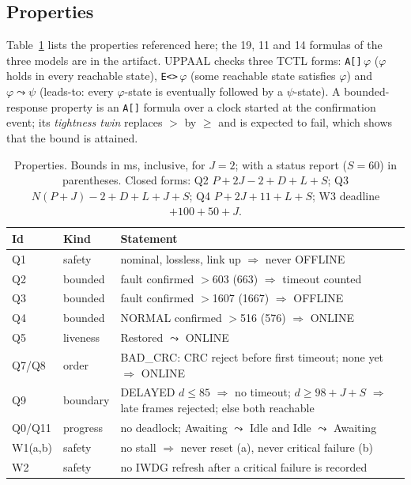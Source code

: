 \documentclass[conference,a4paper]{IEEEtran}
\newif\ifrerunmarks
\DeclareRobustCommand{\rerun}[1]{\ifrerunmarks\textcolor{red}{#1}\else#1\fi}
\begin{document}
\subsection{Properties}
\label{sec:props}
Table~\ref{tab:props} lists the properties referenced here; the 19, 11 and 14 formulas of the three models are in the artifact. UPPAAL checks three TCTL forms: \texttt{A[]}\,$\varphi$ ($\varphi$ holds in every reachable state), \texttt{E<>}\,$\varphi$ (some reachable state satisfies $\varphi$) and $\varphi \leadsto \psi$ (leads-to: every $\varphi$-state is eventually followed by a $\psi$-state). A bounded-response property is an \texttt{A[]} formula over a clock started at the confirmation event; its \emph{tightness twin} replaces $>$ by $\ge$ and is expected to fail, which shows that the bound is attained.

\begin{table}[t]
\centering\footnotesize
\caption{Properties. Bounds in ms, inclusive, for \rerun{$J{=}2$}; with a status report (\rerun{$S{=}60$}) in parentheses. Closed forms: Q2 $P{+}2J{-}2{+}D{+}L{+}S$; Q3 $N(P{+}J){-}2{+}D{+}L{+}J{+}S$; Q4 $P{+}2J{+}\rerun{11}{+}L{+}S$; W3 deadline${+}100{+}50{+}J$.}
\label{tab:props}
\setlength{\tabcolsep}{4pt}
\begin{tabularx}{\columnwidth}{@{}l l >{\raggedright\arraybackslash}X@{}}
\toprule
Id & Kind & Statement \\
\midrule
Q1 & safety & nominal, lossless, link up $\Rightarrow$ never OFFLINE \\
Q2 & bounded & fault confirmed $>$\rerun{603 (663)} $\Rightarrow$ timeout counted \\
Q3 & bounded & fault confirmed $>$\rerun{1607 (1667)} $\Rightarrow$ OFFLINE \\
Q4 & bounded & NORMAL confirmed $>$\rerun{516 (576)} $\Rightarrow$ ONLINE \\
Q5 & liveness & Restored $\leadsto$ ONLINE \\
Q7/Q8 & order & BAD\_CRC: CRC reject before first timeout; none yet $\Rightarrow$ ONLINE \\
Q9 & boundary & DELAYED $d{\le}\rerun{85}$ $\Rightarrow$ no timeout; $d{\ge}98{+}J{+}S$ $\Rightarrow$ late frames rejected; else both reachable \\
Q0/Q11 & progress & no deadlock; Awaiting $\leadsto$ Idle and Idle $\leadsto$ Awaiting \\
W1(a,b) & safety & no stall $\Rightarrow$ never reset (a), never critical failure (b) \\
W2 & safety & no IWDG refresh after a critical failure is recorded \\

\end{tabularx}
\end{table}
\end{document}
